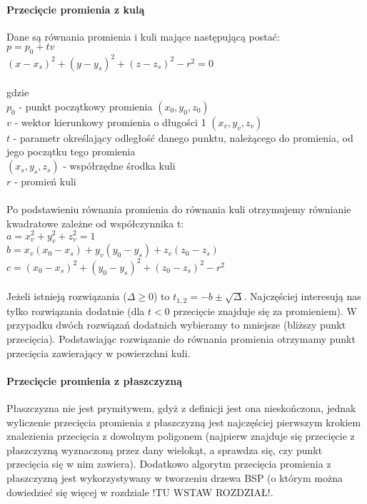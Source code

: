 \paragraph{Przecięcie promienia z kulą}
Dane są równania promienia i kuli mające następującą postać:
\\
$p = p_0 + tv$ \\
$(x - x_s)^2 + (y - y_s)^2 + (z - z_s)^2 - r^2 = 0$ \\
\\
gdzie
\\
$p_0$ - punkt początkowy promienia $(x_0, y_0, z_0)$ \\
$v$ - wektor kierunkowy promienia o długości 1 $(x_v, y_v, z_v)$ \\
$t$ - parametr określający odległość danego punktu, należącego do promienia, od jego początku tego promienia \\
$(x_s, y_s, z_s)$ - współrzędne środka kuli \\
$r$ - promień kuli \\
\\
Po podstawieniu równania promienia do równania kuli otrzymujemy równianie kwadratowe zależne od współczynnika t:
\\
$a = x_v^2 + y_v^2 + z_v^2 = 1$ \\
$b = x_v(x_0 - x_s) + y_v(y_0 - y_s) + z_v(z_0 - z_s)$ \\
$c = (x_0 - x_s)^2 + (y_0 - y_s)^2 + (z_0 - z_s)^2 - r^2$ \\
\\
Jeżeli istnieją rozwiązania ($\Delta \geq 0$) to $t_{1,2} = -b \pm \sqrt{\Delta}$. Najczęściej interesują nas tylko rozwiązania dodatnie (dla $t < 0$ przecięcie znajduje się za promieniem). W przypadku dwóch rozwiązań dodatnich wybieramy to mniejsze (bliższy punkt przecięcia). Podstawiając rozwiązanie do równania promienia otrzymamy punkt przecięcia zawierający w powierzchni kuli.

\paragraph{Przecięcie promienia z płaszczyzną}

Płaszczyzna nie jest prymitywem, gdyż z definicji jest ona nieskończona, jednak wyliczenie przecięcia promienia z płaszczyzną jest najczęściej pierwszym krokiem znalezienia przecięcia z dowolnym poligonem (najpierw znajduje się przecięcie z płaszczyzną wyznaczoną przez dany wielokąt, a sprawdza się, czy punkt przecięcia się w nim zawiera). Dodatkowo algorytm przecięcia promienia z płaszczyzną jest wykorzystywany w tworzeniu drzewa BSP (o którym można dowiedzieć się więcej w rozdziale !TU WSTAW ROZDZIAŁ!. \\

